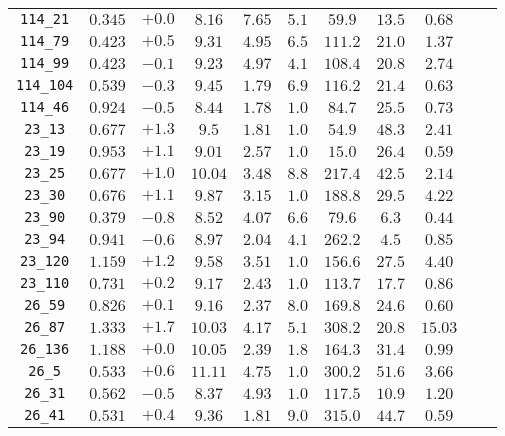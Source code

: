 \begin{table}[htbp]
\begin{tabular}{c c c c c c c c c c c}
\texttt{114\_21}        & $0.345$ & $+0.0$ & $8.16 $ & $7.65 $ & $5.1 $ & $59.9 $ & $13.5$ & $0.68$ \\
\texttt{114\_79}        & $0.423$ & $+0.5$ & $9.31 $ & $4.95 $ & $6.5 $ & $111.2$ & $21.0$ & $1.37$ \\
\texttt{114\_99}        & $0.423$ & $-0.1$ & $9.23 $ & $4.97 $ & $4.1 $ & $108.4$ & $20.8$ & $2.74$ \\
\texttt{114\_104}       & $0.539$ & $-0.3$ & $9.45 $ & $1.79 $ & $6.9 $ & $116.2$ & $21.4$ & $0.63$ \\
\texttt{114\_46}        & $0.924$ & $-0.5$ & $8.44 $ & $1.78 $ & $1.0 $ & $84.7 $ & $25.5$ & $0.73$ \\
\texttt{23\_13}         & $0.677$ & $+1.3$ & $9.5  $ & $1.81 $ & $1.0 $ & $54.9 $ & $48.3$ & $2.41$ \\
\texttt{23\_19}         & $0.953$ & $+1.1$ & $9.01 $ & $2.57 $ & $1.0 $ & $15.0 $ & $26.4$ & $0.59$ \\
\texttt{23\_25}         & $0.677$ & $+1.0$ & $10.04$ & $3.48 $ & $8.8 $ & $217.4$ & $42.5$ & $2.14$ \\
\texttt{23\_30}         & $0.676$ & $+1.1$ & $9.87 $ & $3.15 $ & $1.0 $ & $188.8$ & $29.5$ & $4.22$ \\
\texttt{23\_90}         & $0.379$ & $-0.8$ & $8.52 $ & $4.07 $ & $6.6 $ & $79.6 $ & $6.3 $ & $0.44$ \\
\texttt{23\_94}         & $0.941$ & $-0.6$ & $8.97 $ & $2.04 $ & $4.1 $ & $262.2$ & $4.5 $ & $0.85$ \\
\texttt{23\_120}        & $1.159$ & $+1.2$ & $9.58 $ & $3.51 $ & $1.0 $ & $156.6$ & $27.5$ & $4.40$ \\
\texttt{23\_110}        & $0.731$ & $+0.2$ & $9.17 $ & $2.43 $ & $1.0 $ & $113.7$ & $17.7$ & $0.86$ \\
\texttt{26\_59}         & $0.826$ & $+0.1$ & $9.16 $ & $2.37 $ & $8.0 $ & $169.8$ & $24.6$ & $0.60$ \\
\texttt{26\_87}         & $1.333$ & $+1.7$ & $10.03$ & $4.17 $ & $5.1 $ & $308.2$ & $20.8$ & $15.03$ \\
\texttt{26\_136}        & $1.188$ & $+0.0$ & $10.05$ & $2.39 $ & $1.8 $ & $164.3$ & $31.4$ & $0.99$ \\
\texttt{26\_5}          & $0.533$ & $+0.6$ & $11.11$ & $4.75 $ & $1.0 $ & $300.2$ & $51.6$ & $3.66$ \\
\texttt{26\_31}         & $0.562$ & $-0.5$ & $8.37 $ & $4.93 $ & $1.0 $ & $117.5$ & $10.9$ & $1.20$ \\
\texttt{26\_41}         & $0.531$ & $+0.4$ & $9.36 $ & $1.81 $ & $9.0 $ & $315.0$ & $44.7$ & $0.59$ \\

\end{tabular}
\end{table}
